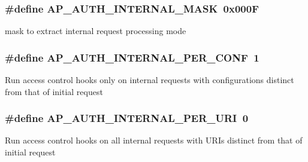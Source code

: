 \subsubsection[{\texorpdfstring{A\+P\+\_\+\+A\+U\+T\+H\+\_\+\+I\+N\+T\+E\+R\+N\+A\+L\+\_\+\+M\+A\+SK}{AP_AUTH_INTERNAL_MASK}}]{\setlength{\rightskip}{0pt plus 5cm}\#define A\+P\+\_\+\+A\+U\+T\+H\+\_\+\+I\+N\+T\+E\+R\+N\+A\+L\+\_\+\+M\+A\+SK~0x000F}\hypertarget{group__APACHE__CORE__REQ__AUTH_gac9aded49a0cc62dfdd1e264a752c5da4}{}\label{group__APACHE__CORE__REQ__AUTH_gac9aded49a0cc62dfdd1e264a752c5da4}
mask to extract internal request processing mode 
\subsubsection[{\texorpdfstring{A\+P\+\_\+\+A\+U\+T\+H\+\_\+\+I\+N\+T\+E\+R\+N\+A\+L\+\_\+\+P\+E\+R\+\_\+\+C\+O\+NF}{AP_AUTH_INTERNAL_PER_CONF}}]{\setlength{\rightskip}{0pt plus 5cm}\#define A\+P\+\_\+\+A\+U\+T\+H\+\_\+\+I\+N\+T\+E\+R\+N\+A\+L\+\_\+\+P\+E\+R\+\_\+\+C\+O\+NF~1}\hypertarget{group__APACHE__CORE__REQ__AUTH_ga66027262bdefd7fe1307a5bda9cfe222}{}\label{group__APACHE__CORE__REQ__AUTH_ga66027262bdefd7fe1307a5bda9cfe222}
Run access control hooks only on internal requests with configurations distinct from that of initial request 
\subsubsection[{\texorpdfstring{A\+P\+\_\+\+A\+U\+T\+H\+\_\+\+I\+N\+T\+E\+R\+N\+A\+L\+\_\+\+P\+E\+R\+\_\+\+U\+RI}{AP_AUTH_INTERNAL_PER_URI}}]{\setlength{\rightskip}{0pt plus 5cm}\#define A\+P\+\_\+\+A\+U\+T\+H\+\_\+\+I\+N\+T\+E\+R\+N\+A\+L\+\_\+\+P\+E\+R\+\_\+\+U\+RI~0}\hypertarget{group__APACHE__CORE__REQ__AUTH_ga2cac15f2a8d7e3b7814af1f1da330054}{}\label{group__APACHE__CORE__REQ__AUTH_ga2cac15f2a8d7e3b7814af1f1da330054}
Run access control hooks on all internal requests with U\+R\+Is distinct from that of initial request 

